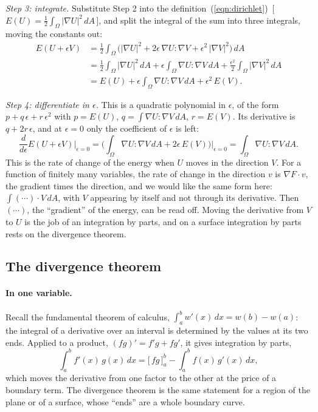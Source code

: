 \emph{Step 3: integrate.} Substitute Step 2 into the definition~(\ref{eqn:dirichlet})~[\,$E(U) = \frac12\int_\Omega |\nabla U|^2\,dA$\,], and split the integral of the sum into three integrals, moving the constants out:
\begin{align*}
E(U + \epsilon V) &= \frac12 \int_\Omega \big( |\nabla U|^2 + 2\epsilon\, \nabla U : \nabla V + \epsilon^2\, |\nabla V|^2 \big)\, dA \\
&= \frac12 \int_\Omega |\nabla U|^2\, dA + \epsilon \int_\Omega \nabla U : \nabla V\, dA + \frac{\epsilon^2}{2} \int_\Omega |\nabla V|^2\, dA \\
&= E(U) + \epsilon \int_\Omega \nabla U : \nabla V\, dA + \epsilon^2\, E(V) .
\end{align*}

\emph{Step 4: differentiate in $\epsilon$.} This is a quadratic polynomial in $\epsilon$, of the form $p + q\,\epsilon + r\,\epsilon^2$ with $p = E(U)$, $q = \int \nabla U : \nabla V\, dA$, $r = E(V)$. Its derivative is $q + 2 r\,\epsilon$, and at $\epsilon = 0$ only the coefficient of $\epsilon$ is left:
\begin{equation*}
\frac{d}{d\epsilon} E(U + \epsilon V)\Big|_{\epsilon = 0} = \Big( \int_\Omega \nabla U : \nabla V\, dA + 2\epsilon\, E(V) \Big)\Big|_{\epsilon = 0} = \int_\Omega \nabla U : \nabla V\, dA .
\end{equation*}
This is the rate of change of the energy when $U$ moves in the direction $V$. For a function of finitely many variables, the rate of change in the direction $v$ is $\nabla F\cdot v$, the gradient times the direction, and we would like the same form here: $\int (\cdots) \cdot V\, dA$, with $V$ appearing by itself and not through its derivative. Then $(\cdots)$, the ``gradient'' of the energy, can be read off. Moving the derivative from $V$ to $U$ is the job of an integration by parts, and on a surface integration by parts rests on the divergence theorem.

\subsection{The divergence theorem}
\label{section:t1_divergence}

\paragraph{In one variable.} Recall the fundamental theorem of calculus, $\int_a^b w'(x)\, dx = w(b) - w(a)$: the integral of a derivative over an interval is determined by the values at its two ends. Applied to a product, $(fg)' = f'g + fg'$, it gives integration by parts,
\begin{equation*}
\int_a^b f'(x)\, g(x)\, dx = \big[\, f g\, \big]_a^b - \int_a^b f(x)\, g'(x)\, dx ,
\end{equation*}
which moves the derivative from one factor to the other at the price of a boundary term. The divergence theorem is the same statement for a region of the plane or of a surface, whose ``ends'' are a whole boundary curve.

